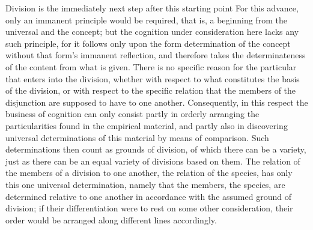 Division is the immediately next step after this starting point
For this advance, only an immanent principle would be required,
that is, a beginning from the universal and the concept;
but the cognition under consideration
here lacks any such principle,
for it follows only upon
the form determination of the concept
without that form's immanent reflection,
and therefore takes the determinateness of
the content from what is given.
There is no specific reason for
the particular that enters into the division,
whether with respect to what constitutes
the basis of the division,
or with respect to the specific relation
that the members of the disjunction
are supposed to have to one another.
Consequently, in this respect the business of cognition
can only consist partly in orderly arranging
the particularities found in the empirical material,
and partly also in discovering universal determinations of
this material by means of comparison.
Such determinations then count as grounds of division,
of which there can be a variety,
just as there can be an equal variety of divisions based on them.
The relation of the members of a division to one another,
the relation of the species,
has only this one universal determination,
namely that the members, the species,
are determined relative to one another in accordance
with the assumed ground of division;
if their differentiation were
to rest on some other consideration,
their order would be arranged
along different lines accordingly.


